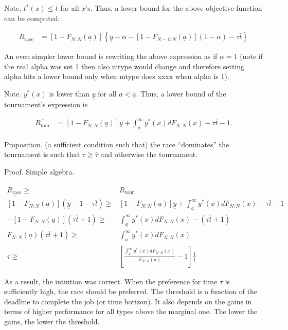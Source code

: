 \documentclass[12pt,]{article}
\newcommand\deadline{\bar{t}}
\newcommand\target{\underline{y}}
\newcommand\race{\text{race}}
\newcommand\tournament{\text{tour}}
\newcommand\mtype{\underline{a}}
\begin{document}
Note. \(t^*(x) \leq \deadline\) for all \(x\)'s. Thus, a lower bound for
the above objective function can be computed:

\begin{align}
\underline {R_\race} & = 
  [1-F_{N:N}(\mtype)] \left\{\target - \alpha -
  [1-F_{N-1:N}(\mtype)] (1 - \alpha) - \tau \deadline\right\}
\end{align}

An even simpler lower bound is rewriting the above expression as if
\(\alpha=1\) (note if the real alpha was set 1 then also mtype would
change and therefore setting alpha hits a lower bound only when mtype
does xxxx when alpha is 1).

Note. \(y^*(x)\) is lower than \(\target\) for all \(a < \mtype\). Thus,
a lower bound of the tournament's expression is

\begin{align}
\overline {R_\tournament} & = 
  [1-F_{N:N}(\mtype)] \target + \int_{\mtype}^\infty y^*(x) dF_{N:N}(x) 
  - \tau \deadline - 1. 
\end{align}

Proposition. (a sufficient condition such that) the race ``dominates''
the tournament is such that \(\tau \geq \hat \tau\) and otherwise the
tournament.

Proof. Simple algebra.

\begin{align}
  \underline {R_\race} \geq & \overline {R_\tournament} \nonumber\\
  [1-F_{N:N}(\mtype)] (\target - 1 - \tau \deadline) \geq &
  [1-F_{N:N}(\mtype)] \target + \int_{\mtype}^\infty y^*(x) dF_{N:N}(x) 
  - \tau \deadline - 1 \nonumber\\
  - [1-F_{N:N}(\mtype)] (\tau\deadline + 1) \geq &
  \int_{\mtype}^\infty y^*(x) dF_{N:N}(x) 
  - (\tau \deadline + 1) \nonumber\\
  F_{N:N}(\mtype) (\tau \deadline + 1) \geq &
  \int_{\mtype}^\infty y^*(x) dF_{N:N}(x) \nonumber\\
  \tau \geq & 
    \left[
      \frac{\int_{\mtype}^\infty y^*(x) dF_{N:N}(x)}{F_{N:N}(\mtype)} -1 
    \right] \frac{1}{\deadline}
\end{align}

As a result, the intuition was correct. When the preference for time
\(\tau\) is sufficiently high, the race should be preferred. The
threshold is a function of the deadline to complete the job (or time
horizon). It also depends on the gains in terms of higher performance
for all types above the marginal one. The lower the gains, the lower the
threshold.
\end{document}
